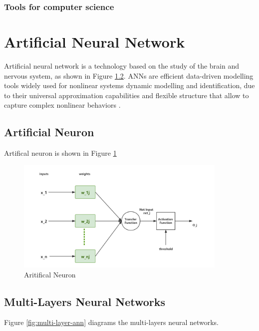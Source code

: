 \subsubsection{Tools for computer science}

\section{Artificial Neural Network}
Artificial neural network is a technology based on the study of the brain and nervous system\parencite{WALCZAK2003631}, as shown in Figure \ref{}. ANNs are efficient data-driven modelling tools widely used for nonlinear systems dynamic modelling and identification, due to their universal approximation capabilities and flexible structure that allow to capture complex nonlinear behaviors \parencite{SHOKRY2018265}. 



\subsection{Artificial Neuron}
Artifical neuron is shown in Figure \ref{fig:neuron}

\begin{figure}[htbp]
\centering
\includegraphics[width=0.9\textwidth]{./images/neuron.png}
\caption{Aritifical Neuron}
\label{fig:neuron}
\end{figure}

\subsection{Multi-Layers Neural Networks}
Figure \ref{fig:multi-layer-ann} diagrams the multi-layers neural networks.

